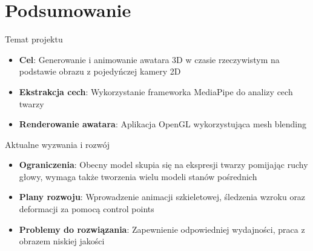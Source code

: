 \documentclass{beamer}
\begin{document}
\section{Podsumowanie}
  \begin{frame}
    \begin{block}{Temat projektu}
      \begin{itemize}
        \item \textbf{Cel}: Generowanie i animowanie awatara 3D w czasie rzeczywistym na podstawie obrazu z pojedyńczej kamery 2D
        \item \textbf{Ekstrakcja cech}: Wykorzystanie frameworka MediaPipe do analizy cech twarzy
        \item \textbf{Renderowanie awatara}: Aplikacja OpenGL wykorzystująca mesh blending
      \end{itemize}
    \end{block}
    \begin{block}{Aktualne wyzwania i rozwój}
      \begin{itemize}
        \item \textbf{Ograniczenia}: Obecny model skupia się na ekspresji twarzy pomijając ruchy głowy, wymaga także tworzenia wielu modeli stanów pośrednich
        \item \textbf{Plany rozwoju}: Wprowadzenie animacji szkieletowej, śledzenia wzroku oraz deformacji za pomocą control points
        \item \textbf{Problemy do rozwiązania}: Zapewnienie odpowiedniej wydajności, praca z obrazem niskiej jakości 
      \end{itemize}
    \end{block}
  \end{frame}
\end{document}
